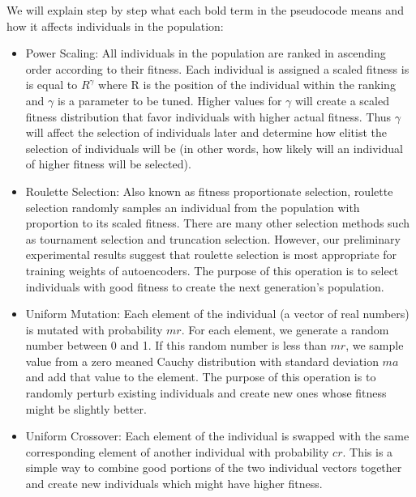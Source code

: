 We will explain step by step what each bold term in the pseudocode means and how it affects individuals in the population:

\begin{itemize}
  \item Power Scaling: All individuals in the population are ranked in ascending order according to their fitness. Each individual is assigned a scaled fitness is is equal to $R^{\gamma}$ where R is the position of the individual within the ranking and $\gamma$ is a parameter to be tuned. Higher values for $\gamma$ will create a scaled fitness distribution that favor individuals with higher actual fitness. Thus $\gamma$ will affect the selection of individuals later and determine how elitist the selection of individuals will be (in other words, how likely will an individual of higher fitness will be selected).
  \item Roulette Selection: Also known as fitness proportionate selection, roulette selection randomly samples an individual from the population with proportion to its scaled fitness. There are many other selection methods such as tournament selection and truncation selection. However, our preliminary experimental results suggest that roulette selection is most appropriate for training weights of autoencoders. The purpose of this operation is to select individuals with good fitness to create the next generation's population. 
  \item Uniform Mutation: Each element of the individual (a vector of real numbers) is mutated with probability $mr$. For each element, we generate a random number between 0 and 1. If this random number is less than $mr$, we sample value from a zero meaned Cauchy distribution with standard deviation $ma$ and add that value to the element. The purpose of this operation is to randomly perturb existing individuals and create new ones whose fitness might be slightly better. 
  \item Uniform Crossover: Each element of the individual is swapped with the same corresponding element of another individual with probability $cr$. This is a simple way to combine good portions of the two individual vectors together and create new individuals which might have higher fitness.
\end{itemize}
